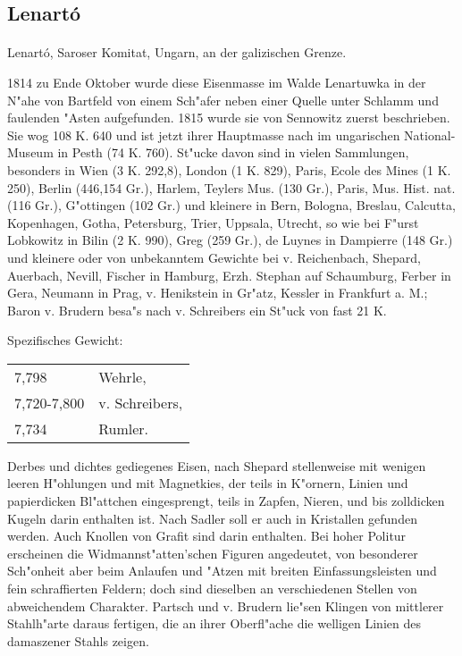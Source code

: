 \documentclass[a4paper, 11pt, oneside]{article}
\begin{document}
\subsection{Lenartó}
\normalsize
\paragraph{}
Lenartó, Saroser Komitat, Ungarn, an der galizischen Grenze.

1814 zu Ende Oktober wurde diese Eisenmasse im Walde Lenartuwka in der N"ahe von Bartfeld von einem Sch"afer neben einer Quelle unter Schlamm und faulenden "Asten aufgefunden. 1815 wurde sie von Sennowitz zuerst beschrieben. Sie wog 108 K. 640 und ist jetzt ihrer Hauptmasse nach im ungarischen National-Museum in Pesth (74 K. 760). St"ucke davon sind in vielen Sammlungen, besonders in Wien (3 K. 292,8), London (1 K. 829), Paris, Ecole des Mines (1 K. 250), Berlin (446,154 Gr.), Harlem, Teylers Mus. (130 Gr.), Paris, Mus. Hist. nat. (116 Gr.), G"ottingen (102 Gr.) und kleinere in Bern, Bologna, Breslau, Calcutta, Kopenhagen, Gotha, Petersburg, Trier, Uppsala, Utrecht, so wie bei F"urst Lobkowitz in Bilin (2 K. 990), Greg (259 Gr.), de Luynes in Dampierre (148 Gr.) und kleinere oder von unbekanntem Gewichte bei v. Reichenbach, Shepard, Auerbach, Nevill, Fischer in Hamburg, Erzh. Stephan auf Schaumburg, Ferber in Gera, Neumann in Prag, v. Henikstein in Gr"atz, Kessler in Frankfurt a. M.; Baron v. Brudern besa"s nach v. Schreibers ein St"uck von fast 21 K.

Spezifisches Gewicht:  
\begin{table}[!ht]
    \centering
    \begin{tabular}{l l}
        7,798 & Wehrle,\\
        7,720-7,800 & v. Schreibers,\\
        7,734 & Rumler.
    \end{tabular}
\end{table}

Derbes und dichtes gediegenes Eisen, nach Shepard stellenweise mit wenigen leeren H"ohlungen und mit Magnetkies, der teils in K"ornern, Linien und papierdicken Bl"attchen eingesprengt, teils in Zapfen, Nieren, und bis zolldicken Kugeln darin enthalten ist. Nach Sadler soll er auch in Kristallen gefunden werden. Auch Knollen von Grafit sind darin enthalten. Bei hoher Politur erscheinen die Widmannst"atten'schen Figuren angedeutet, von besonderer Sch"onheit aber beim Anlaufen und "Atzen mit breiten Einfassungsleisten und fein schraffierten Feldern; doch sind dieselben an verschiedenen Stellen von abweichendem Charakter. Partsch und v. Brudern lie"sen Klingen von mittlerer Stahlh"arte daraus fertigen, die an ihrer Oberfl"ache die welligen Linien des damaszener Stahls zeigen.
\end{document}
